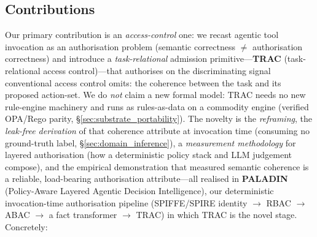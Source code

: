 \documentclass[sigconf,review,anonymous]{acmart}
\begin{document}
\subsection{Contributions}
\label{sec:contributions}

Our primary contribution is an \emph{access-control} one: we recast agentic tool invocation as an authorisation problem (semantic correctness $\neq$ authorisation correctness) and introduce a \emph{task-relational} admission primitive---\textbf{TRAC} (task-relational access control)---that authorises on the discriminating signal conventional access control omits: the coherence between the task and its proposed action-set. We do \emph{not} claim a new formal model: TRAC needs no new rule-engine machinery and runs as rules-as-data on a commodity engine (verified OPA/Rego parity, \S\ref{sec:substrate_portability}). The novelty is the \emph{reframing}, the \emph{leak-free derivation} of that coherence attribute at invocation time (consuming no ground-truth label, \S\ref{sec:domain_inference}), a \emph{measurement methodology} for layered authorisation (how a deterministic policy stack and LLM judgement compose), and the empirical demonstration that measured semantic coherence is a reliable, load-bearing authorisation attribute---all realised in \textbf{PALADIN} (Policy-Aware Layered Agentic Decision Intelligence), our deterministic invocation-time authorisation pipeline (SPIFFE/SPIRE identity $\to$ RBAC $\to$ ABAC $\to$ a fact transformer $\to$ TRAC) in which TRAC is the novel stage. Concretely:
\end{document}
